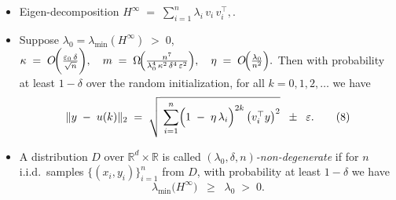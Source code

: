 \documentclass[serif, aspectratio=169]{beamer}
\begin{document}
\begin{frame}
\begin{itemize}

		\item Eigen-decomposition $H^\infty\;=\; \sum_{i=1}^n \lambda_i\,v_i\,v_i^\top,$.


\item Suppose $\lambda_0 = \lambda_{\min}(H^\infty) \;>\; 0$, 
	\(
	\kappa \;=\; O\!\biggl(\frac{\varepsilon_0\,\delta}{\sqrt{n}}\biggr),
	\quad
	m \;=\; \Omega\!\Bigl(\frac{n^7}{\lambda_0^4\,\kappa^2\,\delta^4\,\varepsilon^2}\Bigr),
	\quad
	\eta \;=\; O\!\Bigl(\frac{\lambda_0}{n^2}\Bigr).
	\)
	Then with probability at least $1 - \delta$ over the random initialization, 
	for all $k = 0,1,2,\dots$ we have
	\[
	\|y \;-\; u(k)\|_2 
	\;=\;
	\sqrt{\;\sum_{i=1}^n \Bigl(1 \;-\; \eta\,\lambda_i\Bigr)^{2k}\,\bigl(v_i^\top y\bigr)^2}
	\;\;\pm\;\;\varepsilon.
	\tag{8}
	\]



\item 
	A distribution $D$ over $\mathbb{R}^d \times \mathbb{R}$ is called 
	$(\lambda_0,\delta,n)$\emph{-non-degenerate} 
	if for $n$ i.i.d.\ samples $\{(x_i,y_i)\}_{i=1}^n$ from $D$, 
	with probability at least $1 - \delta$ we have
	\[
	\lambda_{\min}\bigl(H^\infty\bigr) \;\;\ge\;\; \lambda_0 \;>\; 0.
	\]

\end{itemize}

\end{frame}


%

\end{document}
